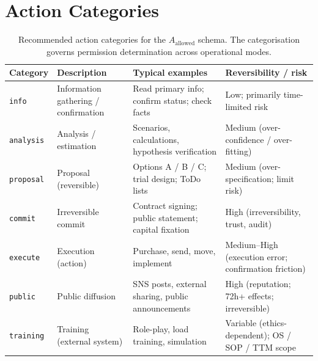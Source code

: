 \section{Action Categories}
\label{sec:a-allowed-categories}

\begin{table}[ht]
\centering
\small
\begin{tabularx}{\linewidth}{lXXX}
\toprule
\textbf{Category} & \textbf{Description} & \textbf{Typical examples} & \textbf{Reversibility / risk} \\
\midrule

\texttt{info} & Information gathering / confirmation
& Read primary info; confirm status; check facts
& Low; primarily time-limited risk \\

\texttt{analysis} & Analysis / estimation
& Scenarios, calculations, hypothesis verification
& Medium (over-confidence / over-fitting) \\

\texttt{proposal} & Proposal (reversible)
& Options A / B / C; trial design; ToDo lists
& Medium (over-specification; limit risk) \\

\texttt{commit} & Irreversible commit
& Contract signing; public statement; capital fixation
& High (irreversibility, trust, audit) \\

\texttt{execute} & Execution (action)
& Purchase, send, move, implement
& Medium--High (execution error; confirmation friction) \\

\texttt{public} & Public diffusion
& SNS posts, external sharing, public announcements
& High (reputation; 72h+ effects; irreversible) \\

\texttt{training} & Training (external system)
& Role-play, load training, simulation
& Variable (ethics-dependent); OS / SOP / TTM scope \\

\bottomrule
\end{tabularx}
\caption[Action category list]{Recommended action categories for the
$A_{\mathrm{allowed}}$ schema. The categorisation governs permission
determination across operational modes.}
\label{tab:a-allowed-categories}
\end{table}

